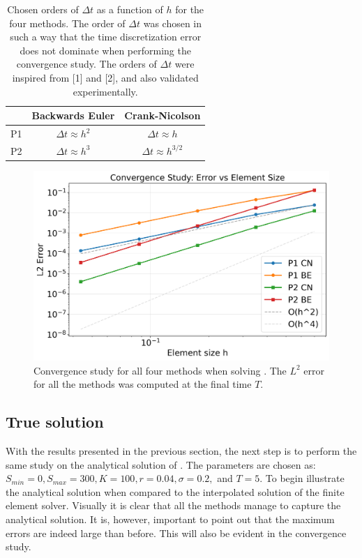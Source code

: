 \documentclass{article}
\begin{document}
\begin{table}[h!]
\centering
\begin{tabular}{|c|c|c|}
\hline
 & Backwards Euler & Crank-Nicolson \\
\hline
P1 & $\Delta t \approx h^2$ & $\Delta t \approx h$ \\
\hline
P2 & $\Delta t \approx h^3$ & $\Delta t \approx h^{3/2}$ \\
\hline
\end{tabular}
\caption{Chosen orders of $\Delta t$ as a function of $h$ for the four methods. The order of $\Delta t$ was chosen in such a way that the time discretization error does not dominate when performing the convergence study. The orders of $\Delta t$ were inspired from [1] and [2], and also validated experimentally.}
\label{tab:orders}
\end{table}




\begin{figure}[!ht]
    \centering
    \includegraphics[width=0.7\linewidth]{code/images/convergence_study_BlackScholesConstructedCos.png}
    \caption{Convergence study for all four methods when solving . The $L^2$ error for all the methods was computed at the final time $T$.}
    \label{fig:conv_cos}
\end{figure}

\subsection{True solution}\label{sec:true_sol}
With the results presented in the previous section, the next step is to perform the same study on the analytical solution of . The parameters are chosen as: $S_{min}=0, S_{max}=300, K=100, r=0.04, \sigma =0.2, $ and $T = 5$. To begin  illustrate the analytical solution when compared to the interpolated solution of the finite element solver. Visually it is clear that all the methods manage to capture the analytical solution. It is, however, important to point out that the maximum errors are indeed large than before. This will also be evident in the convergence study. 
\end{document}
